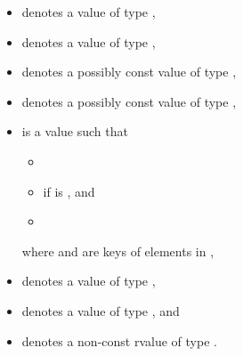 \documentclass{wg21}
\begin{document}
\begin{itemize}
    \item
     denotes a value of type ,
    \item
     denotes a value of type ,
    \item
     denotes a possibly const value of type ,
    \item
     denotes a possibly const value of type ,
    \item
     is a value such that
    \begin{itemize}
        \item {}
        \item {} if  is , and
        \item {}
    \end{itemize}
    where  and  are keys of elements in ,
    \item
     denotes a value of type ,
    \item
     denotes a value of type , and
    \item
     denotes a non-const rvalue of type .
\end{itemize}

\newcommand{\indexunordmem}[1]{%
    \indexlibrary{\idxcode{#1}!unordered associative containers}%
    \indexlibrary{\idxcode{unordered_set}!\idxcode{#1}}%
    \indexlibrary{\idxcode{unordered_map}!\idxcode{#1}}%
    \indexlibrary{\idxcode{unordered_multiset}!\idxcode{#1}}%
    \indexlibrary{\idxcode{unordered_multimap}!\idxcode{#1}}%
}
\end{document}
